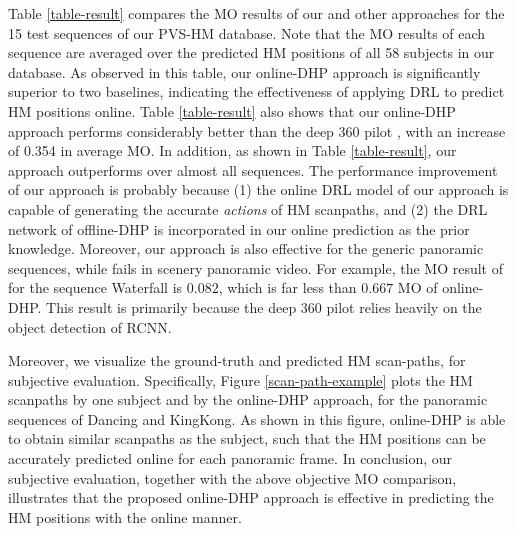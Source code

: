 \documentclass[10pt,journal,compsoc]{IEEEtran}
\begin{document}
Table \ref{table-result} compares the MO results of our and other approaches for the 15 test sequences of our PVS-HM database. Note that the MO results of each sequence are averaged over the predicted HM positions of all 58 subjects in our database. As observed in this table, our online-DHP approach is significantly superior to two baselines, indicating the effectiveness of applying DRL to predict HM positions online.
Table \ref{table-result} also shows that our online-DHP approach performs considerably better than the deep 360 pilot \cite{hu2017deep}, with an increase of 0.354 in average MO.
In addition, as shown in Table \ref{table-result}, our approach outperforms \cite{hu2017deep} over almost all sequences.
The performance improvement of our approach is probably because (1) the online DRL model of our approach is capable of generating the accurate \textit{actions} of HM scanpaths, and (2) the DRL network of offline-DHP is incorporated in our online prediction as the prior knowledge. Moreover, our approach is also effective for the generic panoramic sequences, while \cite{hu2017deep} fails in scenery panoramic video. For example, the MO result of \cite{hu2017deep} for the sequence Waterfall is $0.082$, which is far less than $0.667$ MO of online-DHP. This result is primarily because the deep 360 pilot \cite{hu2017deep} relies heavily on the object detection of RCNN.

Moreover, we visualize the ground-truth and predicted HM scan-paths, for subjective evaluation.
Specifically, Figure \ref{scan-path-example} plots the HM scanpaths by one subject and by the online-DHP approach, for the panoramic sequences of Dancing and KingKong.
As shown in this figure, online-DHP is able to obtain similar scanpaths as the subject, such that the HM positions can be accurately predicted online for each panoramic frame.
In conclusion, our subjective evaluation, together with the above objective MO comparison, illustrates that the proposed online-DHP approach is effective in predicting the HM positions with the online manner.

\end{document}

